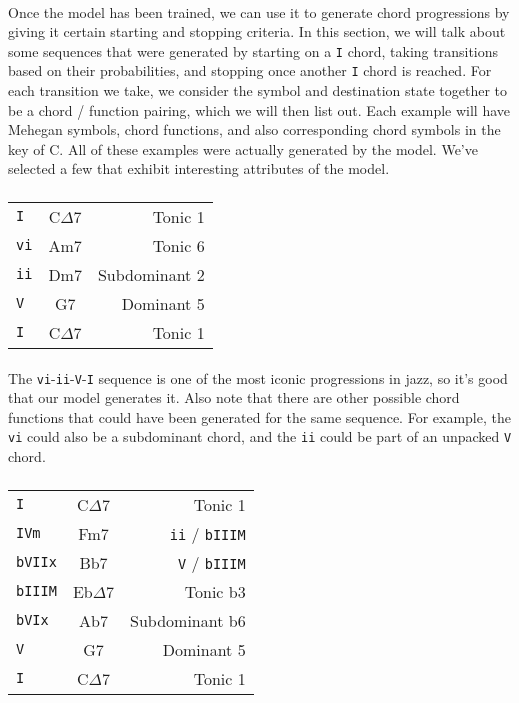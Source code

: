 \documentclass[]{article}
\begin{document}
\paragraph{} Once the model has been trained, we can use it to generate chord progressions by giving it certain starting and stopping criteria.  In this section, we will talk about some sequences that were generated by starting on a \texttt{I} chord, taking transitions based on their probabilities, and stopping once another \texttt{I} chord is reached.  For each transition we take, we consider the symbol and destination state together to be a chord / function pairing, which we will then list out.  Each example will have Mehegan symbols, chord functions, and also corresponding chord symbols in the key of C.  All of these examples were actually generated by the model.  We've selected a few that exhibit interesting attributes of the model.

\subsubsection{}
\begin{tabular}{l|c|r}
	\texttt{I} & C$\Delta$7 & Tonic 1 \\
	\texttt{vi} & Am7 & Tonic 6 \\
	\texttt{ii} & Dm7 & Subdominant 2 \\
	\texttt{V} & G7 & Dominant 5 \\
	\texttt{I} & C$\Delta$7 & Tonic 1
\end{tabular}
\paragraph{} The \texttt{vi}-\texttt{ii}-\texttt{V}-\texttt{I} sequence is one of the most iconic progressions in jazz, so it's good that our model generates it.  Also note that there are other possible chord functions that could have been generated for the same sequence.  For example, the \texttt{vi} could also be a subdominant chord, and the \texttt{ii} could be part of an unpacked \texttt{V} chord.

\subsubsection{}
\begin{tabular}{l|c|r}
	\texttt{I} & C$\Delta$7 & Tonic 1 \\
	\texttt{IVm} & Fm7 & \texttt{ii} / \texttt{bIIIM} \\
	\texttt{bVIIx} & Bb7 & \texttt{V} / \texttt{bIIIM} \\
	\texttt{bIIIM} & Eb$\Delta$7 & Tonic b3 \\
	\texttt{bVIx} & Ab7 & Subdominant b6 \\
	\texttt{V} & G7 & Dominant 5 \\
	\texttt{I} & C$\Delta$7 & Tonic 1
\end{tabular}
\end{document}
